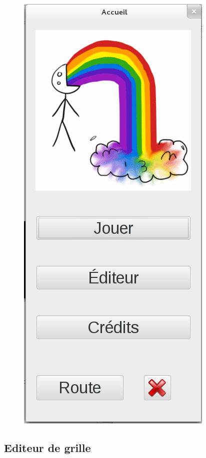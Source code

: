 \documentclass[a4paper, 12pt, twoside]{article}
\begin{document}
\begin{figure}[H]
  \center
  \includegraphics[scale=0.6]{accueil.png}
  \label{accueil}
\end{figure}
\newpage
\subsection{Editeur de grille}
\end{document}
